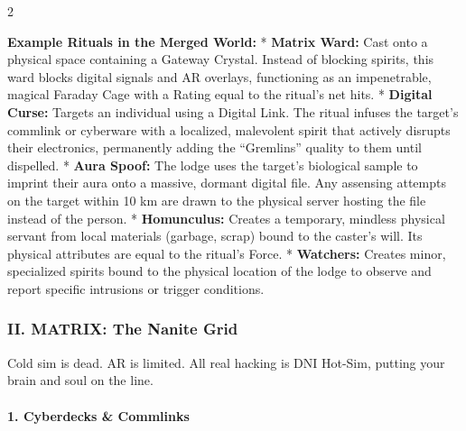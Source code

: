 \documentclass[
  oneside]{article}
\begin{document}
\begin{multicols}{2}

\textbf{Example Rituals in the Merged World:} *
\textbf{Matrix Ward:} Cast onto a physical space
containing a Gateway Crystal. Instead of blocking
spirits, this ward blocks digital signals and AR
overlays, functioning as an impenetrable, magical
Faraday Cage with a Rating equal to the ritual's
net hits. * \textbf{Digital Curse:} Targets an
individual using a Digital Link. The ritual
infuses the target's commlink or cyberware with a
localized, malevolent spirit that actively
disrupts their electronics, permanently adding the
``Gremlins'' quality to them until dispelled. *
\textbf{Aura Spoof:} The lodge uses the target's
biological sample to imprint their aura onto a
massive, dormant digital file. Any assensing
attempts on the target within 10 km are drawn to
the physical server hosting the file instead of
the person. * \textbf{Homunculus:} Creates a
temporary, mindless physical servant from local
materials (garbage, scrap) bound to the caster's
will. Its physical attributes are equal to the
ritual's Force. * \textbf{Watchers:} Creates
minor, specialized spirits bound to the physical
location of the lodge to observe and report
specific intrusions or trigger conditions.

\hypertarget{ii.-matrix-the-nanite-grid}{%
\subsubsection{II. MATRIX: The Nanite
Grid}\label{ii.-matrix-the-nanite-grid}}

Cold sim is dead. AR is limited. All real hacking
is DNI Hot-Sim, putting your brain and soul on the
line.

\hypertarget{cyberdecks-commlinks}{%
\paragraph{1. Cyberdecks \&
Commlinks}\label{cyberdecks-commlinks}}

\end{multicols}
\end{document}
